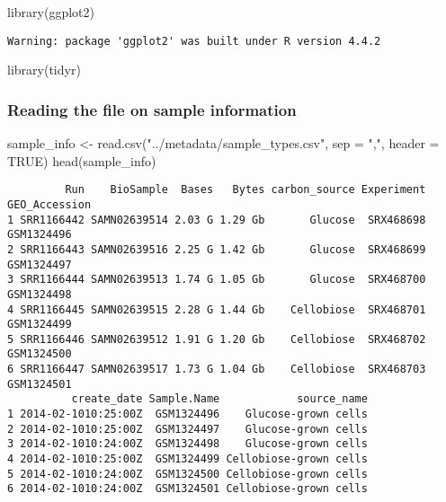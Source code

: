 \documentclass[
  letterpaper,
  DIV=11,
  numbers=noendperiod]{scrartcl}
\newenvironment{Shaded}{\begin{snugshade}}{\end{snugshade}}
\newcommand{\AttributeTok}[1]{\textcolor[rgb]{0.40,0.45,0.13}{#1}}
\newcommand{\ConstantTok}[1]{\textcolor[rgb]{0.56,0.35,0.01}{#1}}
\newcommand{\FunctionTok}[1]{\textcolor[rgb]{0.28,0.35,0.67}{#1}}
\newcommand{\NormalTok}[1]{\textcolor[rgb]{0.00,0.23,0.31}{#1}}
\newcommand{\OtherTok}[1]{\textcolor[rgb]{0.00,0.23,0.31}{#1}}
\newcommand{\StringTok}[1]{\textcolor[rgb]{0.13,0.47,0.30}{#1}}
\begin{document}
\begin{Shaded}
\begin{Highlighting}[]
\FunctionTok{library}\NormalTok{(ggplot2)}
\end{Highlighting}
\end{Shaded}

\begin{verbatim}
Warning: package 'ggplot2' was built under R version 4.4.2
\end{verbatim}

\begin{Shaded}
\begin{Highlighting}[]
\FunctionTok{library}\NormalTok{(tidyr)}
\end{Highlighting}
\end{Shaded}

\subsubsection{Reading the file on sample
information}\label{reading-the-file-on-sample-information}

\begin{Shaded}
\begin{Highlighting}[]
\NormalTok{sample\_info }\OtherTok{\textless{}{-}} \FunctionTok{read.csv}\NormalTok{(}\StringTok{"../metadata/sample\_types.csv"}\NormalTok{, }
                        \AttributeTok{sep =} \StringTok{","}\NormalTok{, }\AttributeTok{header =} \ConstantTok{TRUE}\NormalTok{)}
\FunctionTok{head}\NormalTok{(sample\_info)}
\end{Highlighting}
\end{Shaded}

\begin{verbatim}
         Run    BioSample  Bases   Bytes carbon_source Experiment GEO_Accession
1 SRR1166442 SAMN02639514 2.03 G 1.29 Gb       Glucose  SRX468698    GSM1324496
2 SRR1166443 SAMN02639516 2.25 G 1.42 Gb       Glucose  SRX468699    GSM1324497
3 SRR1166444 SAMN02639513 1.74 G 1.05 Gb       Glucose  SRX468700    GSM1324498
4 SRR1166445 SAMN02639515 2.28 G 1.44 Gb    Cellobiose  SRX468701    GSM1324499
5 SRR1166446 SAMN02639512 1.91 G 1.20 Gb    Cellobiose  SRX468702    GSM1324500
6 SRR1166447 SAMN02639517 1.73 G 1.04 Gb    Cellobiose  SRX468703    GSM1324501
          create_date Sample.Name            source_name
1 2014-02-1010:25:00Z  GSM1324496    Glucose-grown cells
2 2014-02-1010:25:00Z  GSM1324497    Glucose-grown cells
3 2014-02-1010:24:00Z  GSM1324498    Glucose-grown cells
4 2014-02-1010:25:00Z  GSM1324499 Cellobiose-grown cells
5 2014-02-1010:24:00Z  GSM1324500 Cellobiose-grown cells
6 2014-02-1010:24:00Z  GSM1324501 Cellobiose-grown cells
\end{verbatim}
\end{document}
